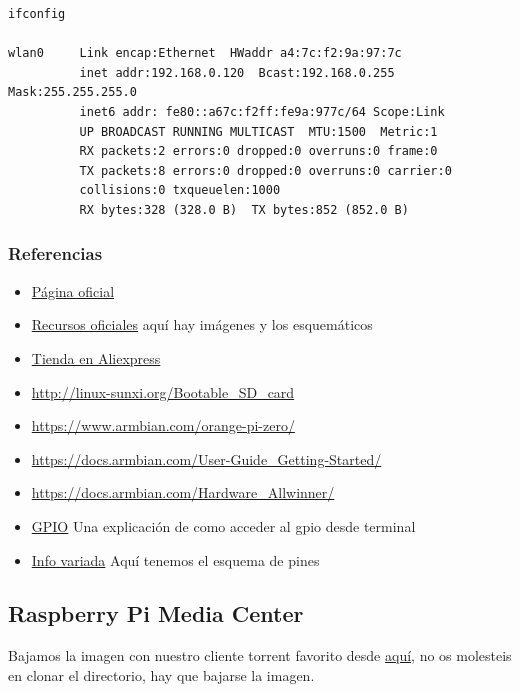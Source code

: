 \documentclass[12pt,spanish,]{scrartcl}
\providecommand{\tightlist}{%
  \setlength{\itemsep}{0pt}\setlength{\parskip}{0pt}}
\begin{document}
\begin{verbatim}
ifconfig

wlan0     Link encap:Ethernet  HWaddr a4:7c:f2:9a:97:7c
          inet addr:192.168.0.120  Bcast:192.168.0.255  Mask:255.255.255.0
          inet6 addr: fe80::a67c:f2ff:fe9a:977c/64 Scope:Link
          UP BROADCAST RUNNING MULTICAST  MTU:1500  Metric:1
          RX packets:2 errors:0 dropped:0 overruns:0 frame:0
          TX packets:8 errors:0 dropped:0 overruns:0 carrier:0
          collisions:0 txqueuelen:1000
          RX bytes:328 (328.0 B)  TX bytes:852 (852.0 B)
\end{verbatim}

\subsubsection{Referencias}\label{referencias-1}

\begin{itemize}
\tightlist
\item
  \href{http://www.orangepi.org/}{Página oficial}
\item
  \href{http://www.orangepi.org/downloadresources/}{Recursos oficiales}
  aquí hay imágenes y los esquemáticos
\item
  \href{https://www.aliexpress.com/store/1553371?spm=2114.8147860.0.0.F1q43C}{Tienda
  en Aliexpress}
\item
  \url{http://linux-sunxi.org/Bootable_SD_card}
\item
  \url{https://www.armbian.com/orange-pi-zero/}
\item
  \url{https://docs.armbian.com/User-Guide_Getting-Started/}
\item
  \url{https://docs.armbian.com/Hardware_Allwinner/}
\item
  \href{https://linux-sunxi.org/GPIO}{GPIO} Una explicación de como
  acceder al gpio desde terminal
\item
  \href{https://linux-sunxi.org/Orange_Pi_Zero}{Info variada} Aquí
  tenemos el esquema de pines
\end{itemize}

\subsection{Raspberry Pi Media Center}\label{raspberry-pi-media-center}

Bajamos la imagen con nuestro cliente torrent favorito desde
\href{https://github.com/aikoncwd/aikoncwd-rpi-mediacenter}{aquí}, no os
molesteis en clonar el directorio, hay que bajarse la imagen.
\end{document}

